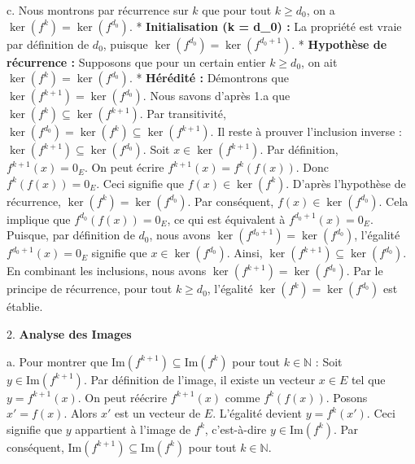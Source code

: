 \documentclass{report}
\begin{document}
    c.  Nous montrons par récurrence sur $k$ que pour tout $k \ge d_0$, on a $\ker(f^k) = \ker(f^{d_0})$.
        *   \textbf{Initialisation (k = d\_0) :} La propriété est vraie par définition de $d_0$, puisque $\ker(f^{d_0}) = \ker(f^{d_0+1})$.
        *   \textbf{Hypothèse de récurrence :} Supposons que pour un certain entier $k \ge d_0$, on ait $\ker(f^k) = \ker(f^{d_0})$.
        *   \textbf{Hérédité :} Démontrons que $\ker(f^{k+1}) = \ker(f^{d_0})$.
            Nous savons d'après 1.a que $\ker(f^k) \subseteq \ker(f^{k+1})$. Par transitivité, $\ker(f^{d_0}) = \ker(f^k) \subseteq \ker(f^{k+1})$.
            Il reste à prouver l'inclusion inverse : $\ker(f^{k+1}) \subseteq \ker(f^{d_0})$.
            Soit $x \in \ker(f^{k+1})$. Par définition, $f^{k+1}(x) = 0_E$.
            On peut écrire $f^{k+1}(x) = f^k(f(x))$. Donc $f^k(f(x)) = 0_E$.
            Ceci signifie que $f(x) \in \ker(f^k)$.
            D'après l'hypothèse de récurrence, $\ker(f^k) = \ker(f^{d_0})$.
            Par conséquent, $f(x) \in \ker(f^{d_0})$.
            Cela implique que $f^{d_0}(f(x)) = 0_E$, ce qui est équivalent à $f^{d_0+1}(x) = 0_E$.
            Puisque, par définition de $d_0$, nous avons $\ker(f^{d_0+1}) = \ker(f^{d_0})$, l'égalité $f^{d_0+1}(x) = 0_E$ signifie que $x \in \ker(f^{d_0})$.
            Ainsi, $\ker(f^{k+1}) \subseteq \ker(f^{d_0})$.
            En combinant les inclusions, nous avons $\ker(f^{k+1}) = \ker(f^{d_0})$.
        Par le principe de récurrence, pour tout $k \ge d_0$, l'égalité $\ker(f^k) = \ker(f^{d_0})$ est établie.

2.  \textbf{Analyse des Images}

    a.  Pour montrer que $\text{Im}(f^{k+1}) \subseteq \text{Im}(f^k)$ pour tout $k \in \mathbb{N}$ :
        Soit $y \in \text{Im}(f^{k+1})$. Par définition de l'image, il existe un vecteur $x \in E$ tel que $y = f^{k+1}(x)$.
        On peut réécrire $f^{k+1}(x)$ comme $f^k(f(x))$.
        Posons $x' = f(x)$. Alors $x'$ est un vecteur de $E$.
        L'égalité devient $y = f^k(x')$.
        Ceci signifie que $y$ appartient à l'image de $f^k$, c'est-à-dire $y \in \text{Im}(f^k)$.
        Par conséquent, $\text{Im}(f^{k+1}) \subseteq \text{Im}(f^k)$ pour tout $k \in \mathbb{N}$.
\end{document}
